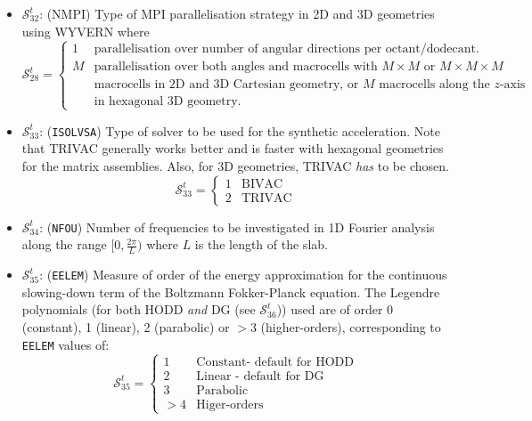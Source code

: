 \begin{itemize}
\item $\mathcal{S}^{t}_{32}$: (NMPI) Type of MPI parallelisation strategy in 2D and 3D geometries using WYVERN where
\begin{displaymath}
\mathcal{S}^{t}_{28} = \left\{
\begin{array}{rl}
 1 & \textrm{parallelisation over number of angular directions per octant/dodecant.}\\
 M & \textrm{parallelisation over both angles and macrocells with $M\times M$ or $M \times M \times M$}\\
  & \textrm{macrocells in 2D and 3D Cartesian geometry, or $M$ macrocells along the $z$-axis}\\
  & \textrm{in hexagonal 3D geometry.}
\end{array} \right.
\end{displaymath}

\item $\mathcal{S}^{t}_{33}$: ({\tt ISOLVSA}) Type of solver to be used for the synthetic acceleration. Note that TRIVAC generally works better and is faster with hexagonal geometries for the matrix assemblies. Also, for 3D geometries, TRIVAC \emph{has} to be chosen.
\begin{displaymath}
\mathcal{S}^{t}_{33} = \left\{
\begin{array}{rl}
 1 & \textrm{BIVAC}\\
 2 & \textrm{TRIVAC}
\end{array} \right.
\end{displaymath}

\item $\mathcal{S}^{t}_{34}$: ({\tt NFOU}) Number of frequencies to be investigated in 1D Fourier analysis along the range $[0, \frac{2\pi}{L})$ where $L$ is the length of the slab.

\item $\mathcal{S}^{t}_{35}$: ({\tt EELEM}) Measure of order of the energy approximation for the continuous slowing-down term of the Boltzmann Fokker-Planck equation. The Legendre polynomials (for both HODD \emph{and} DG (see $\mathcal{S}^{t}_{36}$)) used are of order 0 (constant), 1 (linear), 2 (parabolic) or $>$3 (higher-orders), corresponding to {\tt EELEM} values of:
\begin{displaymath}
\mathcal{S}^{t}_{35} = \left\{
\begin{array}{rl}
 1 & \textrm{Constant- default for HODD} \\
 2 & \textrm{Linear - default for DG} \\
 3 & \textrm{Parabolic} \\
 >4 & \textrm{Higer-orders}
\end{array} \right.
\end{displaymath}


\end{itemize}
